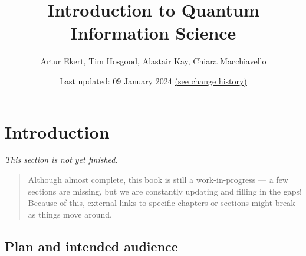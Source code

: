 \documentclass[fleqn,a4paper]{article}
\title{Introduction to Quantum Information Science}
\author{\href{https://www.arturekert.org/}{Artur Ekert}, \href{https://thosgood.com}{Tim Hosgood}, \href{http://www.ma.rhul.ac.uk/akay/}{Alastair Kay}, \href{https://fisica.unipv.it/personale/Persona.php?ID=55}{Chiara Macchiavello}}
\date{Last updated: 09 January 2024 \href{https://github.com/thosgood/qubit.guide/commits/main}{(see change history)}}
\newenvironment{todo}{\color{primary}\emph{This section is not yet finished.}}{}
\let\oldsection\section
\renewcommand\section{\clearpage\oldsection}
\renewcommand{\leq}{\leqslant}
\renewcommand{\geq}{\geqslant}
\theoremstyle{definition}
\theoremstyle{definition}
\theoremstyle{definition}
\theoremstyle{definition}
\theoremstyle{remark}
\begin{document}
\maketitle

\tableofcontents

\providecommand{\xmapsto}[1]{\overset{#1}{\longmapsto}}
\providecommand{\bra}[1]{\langle#1|}
\providecommand{\ket}[1]{|#1\rangle}
\providecommand{\braket}[2]{\langle#1|#2\rangle}
\providecommand{\proj}[1]{|#1\rangle\langle#1|}
\providecommand{\av}[1]{\langle#1\rangle}
\providecommand{\tr}{\operatorname{tr}}
\providecommand{\id}{\mathbf{1}}
\providecommand{\gcd}{\operatorname{gcd}}
\providecommand{\hcf}{\operatorname{hcf}}
\providecommand{\divides}{\mathbin{\vert}}
\providecommand{\diag}[2]{\begin{bmatrix}#1&0\\0&#2\end{bmatrix}}
\providecommand{\smalldiag}[2]{\left(\begin{smallmatrix}#1&0\\0&#2\end{smallmatrix}\right)}
\providecommand{\mqty}[1]{\begin{matrix}#1\end{matrix}}
\providecommand{\bmqty}[1]{\begin{bmatrix}#1\end{bmatrix}}
\renewcommand{\leq}{\leqslant}
\renewcommand{\geq}{\geqslant}
\renewcommand{\mod}[1]{\ \mathrm{mod}\ #1}
\renewcommand{\Im}{\operatorname{Im}}
\renewcommand{\Re}{\operatorname{Re}}

\hypertarget{introduction}{%
\section*{Introduction}\label{introduction}}

\begin{todo}

\end{todo}

\begin{quote}
Although almost complete, this book is still a work-in-progress --- a few sections are missing, but we are constantly updating and filling in the gaps!
Because of this, external links to specific chapters or sections might break as things move around.
\end{quote}

\hypertarget{plan-and-intended-audience}{%
\subsection*{Plan and intended audience}\label{plan-and-intended-audience}}
\end{document}
